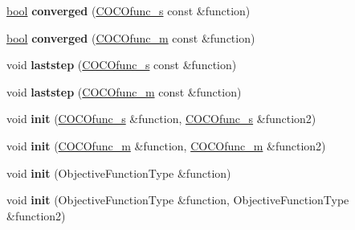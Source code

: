 \begin{DoxyCompactItemize}
\item 
\hyperlink{classbool}{bool} {\bfseries converged} (\hyperlink{classCOCOfunc__s}{C\+O\+C\+Ofunc\+\_\+s} const \&function)\hypertarget{classSAPEOreader_a954f6f76ad4dba97947986b6df825fea}{}\label{classSAPEOreader_a954f6f76ad4dba97947986b6df825fea}

\item 
\hyperlink{classbool}{bool} {\bfseries converged} (\hyperlink{classCOCOfunc__m}{C\+O\+C\+Ofunc\+\_\+m} const \&function)\hypertarget{classSAPEOreader_a2e6035cdcca5dbdeed656cdee0f94987}{}\label{classSAPEOreader_a2e6035cdcca5dbdeed656cdee0f94987}

\item 
void {\bfseries laststep} (\hyperlink{classCOCOfunc__s}{C\+O\+C\+Ofunc\+\_\+s} const \&function)\hypertarget{classSAPEOreader_af560ea08f84b9d1965bd0e45caa73eee}{}\label{classSAPEOreader_af560ea08f84b9d1965bd0e45caa73eee}

\item 
void {\bfseries laststep} (\hyperlink{classCOCOfunc__m}{C\+O\+C\+Ofunc\+\_\+m} const \&function)\hypertarget{classSAPEOreader_a451f5514278f5b005f3711fb29e9042c}{}\label{classSAPEOreader_a451f5514278f5b005f3711fb29e9042c}

\item 
void {\bfseries init} (\hyperlink{classCOCOfunc__s}{C\+O\+C\+Ofunc\+\_\+s} \&function, \hyperlink{classCOCOfunc__s}{C\+O\+C\+Ofunc\+\_\+s} \&function2)\hypertarget{classSAPEOreader_a5eac37ecad0acaa1eec5e572de219116}{}\label{classSAPEOreader_a5eac37ecad0acaa1eec5e572de219116}

\item 
void {\bfseries init} (\hyperlink{classCOCOfunc__m}{C\+O\+C\+Ofunc\+\_\+m} \&function, \hyperlink{classCOCOfunc__m}{C\+O\+C\+Ofunc\+\_\+m} \&function2)\hypertarget{classSAPEOreader_a530acd60fec0c7671613213c92fd5b68}{}\label{classSAPEOreader_a530acd60fec0c7671613213c92fd5b68}

\item 
void {\bfseries init} (Objective\+Function\+Type \&function)\hypertarget{classCocoOptimiser_a0c7df5618e3fba607b32cf77190f49cb}{}\label{classCocoOptimiser_a0c7df5618e3fba607b32cf77190f49cb}

\item 
void {\bfseries init} (Objective\+Function\+Type \&function, Objective\+Function\+Type \&function2)\hypertarget{classCocoOptimiser_af261a238b756aeda91f891ca417ebe58}{}\label{classCocoOptimiser_af261a238b756aeda91f891ca417ebe58}


\end{DoxyCompactItemize}
